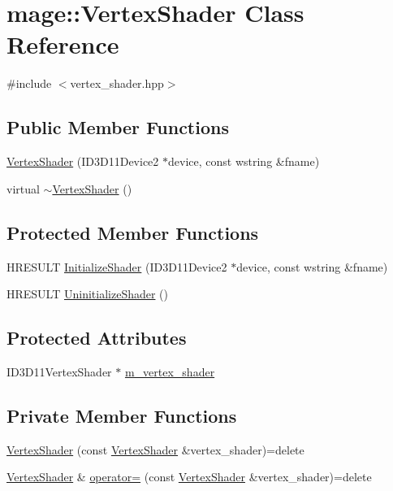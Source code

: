 \hypertarget{classmage_1_1_vertex_shader}{}\section{mage\+:\+:Vertex\+Shader Class Reference}
\label{classmage_1_1_vertex_shader}


{\ttfamily \#include $<$vertex\+\_\+shader.\+hpp$>$}

\subsection*{Public Member Functions}
\begin{DoxyCompactItemize}
\item 
\hyperlink{classmage_1_1_vertex_shader_a5d18f4ce3028666915d0055de5ecfc88}{Vertex\+Shader} (I\+D3\+D11\+Device2 $\ast$device, const wstring \&fname)
\item 
virtual \hyperlink{classmage_1_1_vertex_shader_aa475ad31613dd20fdcc4930409fd0cfd}{$\sim$\+Vertex\+Shader} ()
\end{DoxyCompactItemize}
\subsection*{Protected Member Functions}
\begin{DoxyCompactItemize}
\item 
H\+R\+E\+S\+U\+LT \hyperlink{classmage_1_1_vertex_shader_adf093a15a55e45ac0a33c7adbdec2af4}{Initialize\+Shader} (I\+D3\+D11\+Device2 $\ast$device, const wstring \&fname)
\item 
H\+R\+E\+S\+U\+LT \hyperlink{classmage_1_1_vertex_shader_a87d31b3f958932d98c624b227d7e9129}{Uninitialize\+Shader} ()
\end{DoxyCompactItemize}
\subsection*{Protected Attributes}
\begin{DoxyCompactItemize}
\item 
I\+D3\+D11\+Vertex\+Shader $\ast$ \hyperlink{classmage_1_1_vertex_shader_a1f08ea7d1ebbeb2aba71684f916fc83b}{m\+\_\+vertex\+\_\+shader}
\end{DoxyCompactItemize}
\subsection*{Private Member Functions}
\begin{DoxyCompactItemize}
\item 
\hyperlink{classmage_1_1_vertex_shader_a713f8581278ea2e5eb3010207b7e42a8}{Vertex\+Shader} (const \hyperlink{classmage_1_1_vertex_shader}{Vertex\+Shader} \&vertex\+\_\+shader)=delete
\item 
\hyperlink{classmage_1_1_vertex_shader}{Vertex\+Shader} \& \hyperlink{classmage_1_1_vertex_shader_a0094f5c2adb8377fa5c8d52e7a65136f}{operator=} (const \hyperlink{classmage_1_1_vertex_shader}{Vertex\+Shader} \&vertex\+\_\+shader)=delete
\end{DoxyCompactItemize}


